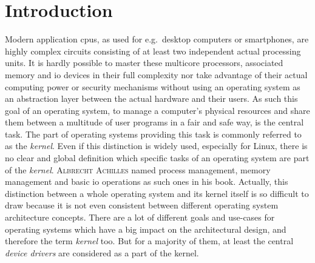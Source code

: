 

\chapter{Introduction}\label{ch:introduction}



Modern application \acp{cpu}, as used for e.g.\ desktop computers or smartphones, are highly complex circuits consisting of at least two independent actual processing units.
It is hardly possible to master these multicore processors, associated memory and \ac{io} devices in their full complexity nor take advantage of their actual computing power or security mechanisms without using an operating system as an abstraction layer between the actual hardware and their users.
As such this goal of an operating system, to manage a computer's physical resources and share them between a multitude of user programs in a fair and safe way, is the central task.
The part of operating systems providing this task is commonly referred to as the \textit{kernel}.  
Even if this distinction is widely used, especially for Linux, there is no clear and global definition which specific tasks of an operating system are part of the \textit{kernel}.
\textsc{Albrecht Achilles} named process management, memory management and basic \ac{io} operations as such ones in his book\cite{achilles2006betriebssysteme}.
Actually, this distinction between a whole operating system and its kernel itself is so difficult to draw because it is not even consistent between different operating system architecture concepts.
There are a lot of different goals and use-cases for operating systems which have a big impact on the architectural design, and therefore the term \textit{kernel} too. 
But for a majority of them, at least the central \textit{device drivers} are considered as a part of the kernel. 

